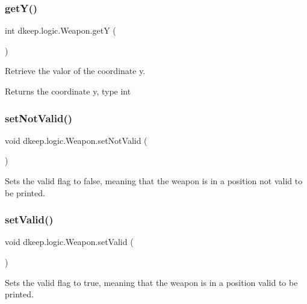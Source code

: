 \subsubsection{\texorpdfstring{get\+Y()}{getY()}}
{\footnotesize\ttfamily int dkeep.\+logic.\+Weapon.\+getY (\begin{DoxyParamCaption}{ }\end{DoxyParamCaption})}

Retrieve the valor of the coordinate y. \begin{DoxyReturn}{Returns}
the coordinate y, type int 
\end{DoxyReturn}
\mbox{\label{classdkeep_1_1logic_1_1_weapon_a93d2e4eb12cf90e2f07d54e7f99e2446}} 
\subsubsection{\texorpdfstring{set\+Not\+Valid()}{setNotValid()}}
{\footnotesize\ttfamily void dkeep.\+logic.\+Weapon.\+set\+Not\+Valid (\begin{DoxyParamCaption}{ }\end{DoxyParamCaption})}

Sets the valid flag to false, meaning that the weapon is in a position not valid to be printed. \mbox{\label{classdkeep_1_1logic_1_1_weapon_a73776355a004878e7ca9a0a32033426f}} 
\subsubsection{\texorpdfstring{set\+Valid()}{setValid()}}
{\footnotesize\ttfamily void dkeep.\+logic.\+Weapon.\+set\+Valid (\begin{DoxyParamCaption}{ }\end{DoxyParamCaption})}

Sets the valid flag to true, meaning that the weapon is in a position valid to be printed. \mbox{\label{classdkeep_1_1logic_1_1_weapon_a5be1b0ffe5c917345fad810d83307461}} 
